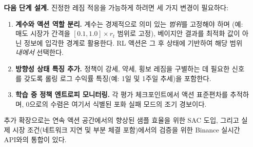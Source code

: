 \documentclass[11pt, a4paper]{article}
\begin{document}
\textbf{다음 단계 설계.}
진정한 레짐 적응을 가능하게 하려면 세 가지 변경이 필요하다:
\begin{enumerate}
    \item \textbf{계수와 액션 역할 분리.}
          계수는 경제적으로 의미 있는 \emph{범위}를 고정해야 하며
          (예: 매도 시장가 간격을 $[0.1, 1.0]\times r_t$ 범위로 고정),
          베이지안 결과를 최적화 값이 아닌 정보에 입각한 경계로 활용한다.
          RL 액션은 그 후 상태에 기반하여 해당 범위 \emph{내에서} 선택한다.
    \item \textbf{방향성 상태 특징 추가.}
          정책이 강세, 약세, 횡보 레짐을 구별하는 데 필요한 신호를 갖도록
          롤링 로그 수익률 특징(예: 1일 및 1주일 추세)을 포함한다.
    \item \textbf{학습 중 정책 엔트로피 모니터링.}
          각 평가 체크포인트에서 액션 표준편차를 추적하며,
          0으로의 수렴은 여기서 식별된 포화 실패 모드의 조기 경보이다.
\end{enumerate}

추가 확장으로는 연속 액션 공간에서의 향상된 샘플 효율을 위한 SAC 도입,
그리고 실제 시장 조건(네트워크 지연 및 부분 체결 포함)에서의 검증을 위한
Binance 실시간 API와의 통합이 있다.

\newpage


\end{document}
